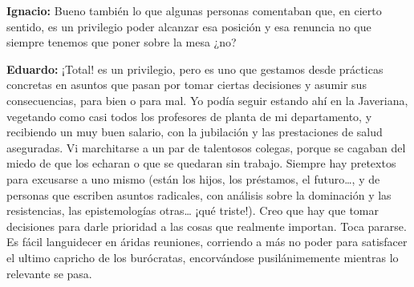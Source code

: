 \documentclass[
]{interact}
\begin{document}
\textbf{Ignacio:} Bueno también lo que algunas personas comentaban que,
en cierto sentido, es un privilegio poder alcanzar esa posición y esa
renuncia no que siempre tenemos que poner sobre la mesa ¿no?

\textbf{Eduardo:} ¡Total! es un privilegio, pero es uno que gestamos
desde prácticas concretas en asuntos que pasan por tomar ciertas
decisiones y asumir sus consecuencias, para bien o para mal. Yo podía
seguir estando ahí en la Javeriana, vegetando como casi todos los
profesores de planta de mi departamento, y recibiendo un muy buen
salario, con la jubilación y las prestaciones de salud aseguradas. Vi
marchitarse a un par de talentosos colegas, porque se cagaban del miedo
de que los echaran o que se quedaran sin trabajo. Siempre hay pretextos
para excusarse a uno mismo (están los hijos, los préstamos, el
futuro\ldots, y de personas que escriben asuntos radicales, con análisis
sobre la dominación y las resistencias, las epistemologías otras\ldots{}
¡qué triste!). Creo que hay que tomar decisiones para darle prioridad a
las cosas que realmente importan. Toca pararse. Es fácil languidecer en
áridas reuniones, corriendo a más no poder para satisfacer el ultimo
capricho de los burócratas, encorvándose pusilánimemente mientras lo
relevante se pasa.
\end{document}
